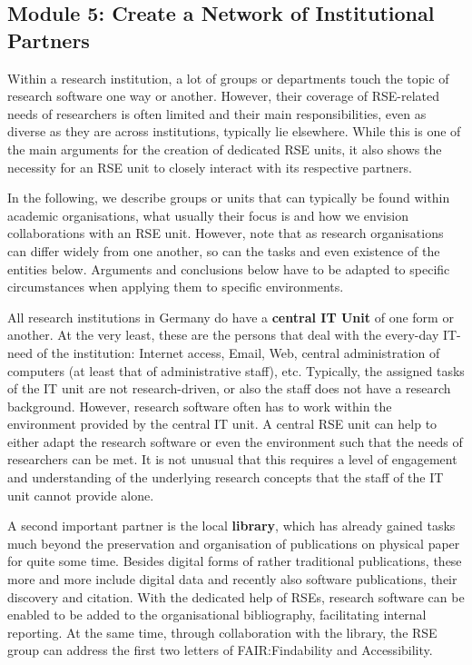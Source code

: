 \documentclass[a4paper]{article}
\begin{document}
\subsection{Module 5: Create a Network of Institutional Partners}%
\label{sec:partners}

Within a research institution, a lot of groups or departments touch the topic of research software one way or another.
However, their coverage of RSE-related needs of researchers is often limited and their main responsibilities, even as diverse as they are across institutions, typically lie elsewhere.
While this is one of the main arguments for the creation of dedicated RSE units, it also shows the necessity for an RSE unit to closely interact with its respective partners.

In the following, we describe groups or units that can typically be found within academic organisations,
what usually their focus is and how we envision collaborations with an RSE unit.
However, note that as research organisations can differ widely from one another, so can the tasks and even existence of the entities below.
Arguments and conclusions below have to be adapted to specific circumstances when applying them to specific environments.

All research institutions in Germany do have a \textbf{central IT Unit} of one form or another.
At the very least, these are the persons that deal with the every-day IT-need of the institution:
Internet access, Email, Web, central administration of computers (at least that of administrative staff), etc.
Typically, the assigned tasks of the IT unit are not research-driven, or also the staff does not have a research background.
However, research software often has to work within the environment provided by the central IT unit.
A central RSE unit can help to either adapt the research software or even the environment such that the needs of researchers can be met.
It is not unusual that this requires a level of engagement and understanding of the underlying research concepts that the staff of the IT unit cannot provide alone.

A second important partner is the local \textbf{library}, which has already gained tasks much beyond the preservation and organisation of publications on physical paper for quite some time.
Besides digital forms of rather traditional publications, these more and more include digital data and recently also software publications, their discovery and citation.
With the dedicated help of RSEs, research software can be enabled to be added to the organisational bibliography, facilitating internal reporting.
At the same time, through collaboration with the library, the RSE group can address the first two letters of FAIR:\@ Findability and Accessibility.
\end{document}
